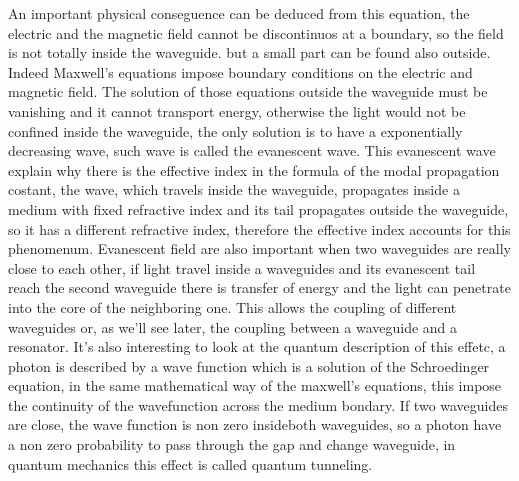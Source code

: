 \documentclass[12pt]{book}
\begin{document}
An important physical conseguence can be deduced from this equation, the electric and the magnetic field cannot be discontinuos at a boundary, so the field is not totally inside the waveguide. but a small part can be found also outside. Indeed Maxwell's equations impose boundary conditions on the electric and magnetic field. The solution of those equations outside the waveguide must be vanishing and it cannot transport energy, otherwise the light would not be confined inside the waveguide, the only solution is to have a exponentially decreasing wave, such wave is called the evanescent wave. This evanescent wave explain why there is the effective index in the formula of the modal propagation costant, the wave, which travels inside the waveguide, propagates inside a medium with fixed refractive index and its tail propagates outside the waveguide, so it has a different refractive index, therefore the effective index accounts for this phenomenum.
Evanescent field are also important when two waveguides are really close to each other, if light travel inside a waveguides and its evanescent tail reach the second waveguide there is transfer of energy and the light can penetrate into the core of the neighboring one. This allows the coupling of different waveguides or, as we'll see later, the coupling between a waveguide and a resonator. It's also interesting to look at the quantum description of this effetc, a photon is described by a wave function which is a solution of the Schroedinger equation, in the same mathematical way of the maxwell's equations, this impose the continuity of the wavefunction across the medium bondary. If two waveguides are close, the wave function is non zero insideboth waveguides, so a photon have a non zero probability to pass through the gap and change waveguide, in quantum mechanics this effect is called quantum tunneling. 
\end{document}
